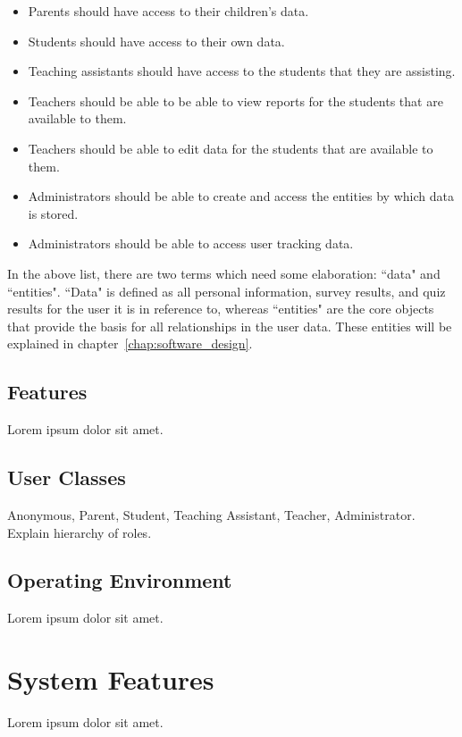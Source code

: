 \begin{itemize}
\item Parents should have access to their children's data.
\item Students should have access to their own data.
\item Teaching assistants should have access to the students that they are assisting.
\item Teachers should be able to be able to view reports for the students that are available to them.
\item Teachers should be able to edit data for the students that are available to them.
\item Administrators should be able to create and access the entities by which data is stored.
\item Administrators should be able to access user tracking data.
\end{itemize}

In the above list, there are two terms which need some elaboration: ``data" and ``entities". ``Data" is defined as all personal information, survey results, and quiz results for the user it is in reference to, whereas ``entities" are the core objects that provide the basis for all relationships in the user data. These entities will be explained in chapter~\ref{chap:software_design}.

\subsection{Features}

Lorem ipsum dolor sit amet.

\subsection{User Classes}

Anonymous, Parent, Student, Teaching Assistant, Teacher, Administrator. Explain hierarchy of roles.

\subsection{Operating Environment}

Lorem ipsum dolor sit amet.

\section{System Features}

Lorem ipsum dolor sit amet.

